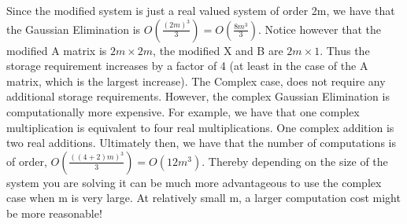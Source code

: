 \documentclass{article}
\begin{document}
\begin{enumerate}
\begin{enumerate}
Since the modified system is just a real valued system of order 2m, we have that the Gaussian Elimination is $O(\frac{(2m)^3}{3}) = O(\frac{8m^3}{3})$. Notice however that the modified A matrix is $2m \times 2m$, the modified X and B are $2m \times 1$. Thus the storage requirement increases by a factor of 4 (at least in the case of the A matrix, which is the largest increase). The Complex case, does not require any additional storage requirements. However, the complex Gaussian Elimination is computationally more expensive. For example, we have that one complex multiplication is equivalent to four real multiplications. One complex addition is two real additions. Ultimately then, we have that the number of computations is of order, $O(\frac{((4+2)m)^3}{3}) = O(12m^3)$. Thereby depending on the size of the system you are solving it can be much more advantageous to use the complex case when m is very large. At relatively small m, a larger computation cost might be more reasonable!
\end{enumerate}

\end{enumerate}
\end{document}
